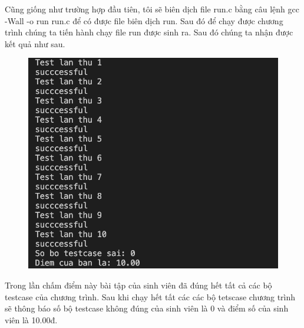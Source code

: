 \documentclass[12pt,a4paper]{article}
\begin{document}
Cũng giống như trường hợp đầu tiên, tôi sẽ biên dịch file run.c bằng câu lệnh gcc -Wall -o run run.c để có được file biên dịch run. Sau đó để chạy được chương trình chúng ta tiến hành chạy file run được sinh ra. Sau đó chúng ta nhận được kết quả như sau.

\begin{figure}[ht]
\begin{center}
\includegraphics[scale=.3]{hinhanh/ketquademoarraydung.png}
\end{center}
\end{figure}

Trong lần chấm điểm này bài tập của sinh viên đã đúng hết tất cả các bộ testcase của chương trình. Sau khi chạy hết tất các các bộ tetscase chương trình sẽ thông báo số bộ testcase không đúng của sinh viên là 0 và điểm số của sinh viên là 10.00đ.
\end{document}

